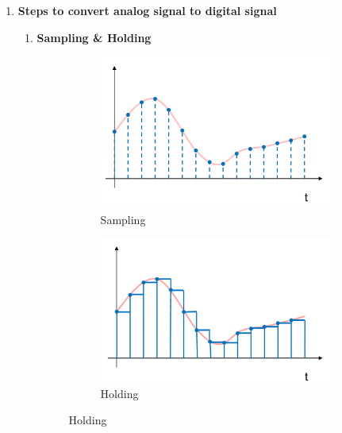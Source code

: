 \documentclass[a4paper]{article}
\begin{document}
\begin{enumerate}[label = \arabic*.]
    \item \textbf{Steps to convert analog signal to digital signal}
      \begin{enumerate}[label = \arabic*.]
        \item \textbf{Sampling \& Holding}
          \begin{figure}[H]
            \centering
            \begin{subfigure}[b]{0.45\linewidth}
              \centering
              \includegraphics[width=0.9\linewidth]{ADC_sampling.jpeg}
              \caption{Sampling}
              \label{subfig:ADC_sampling.jpeg}
            \end{subfigure}
            \begin{subfigure}[b]{0.45\linewidth}
              \centering
              \includegraphics[width=0.9\linewidth]{ADC_holding.jpeg}
              \caption{Holding}
              \label{subfig:ADC_holding.jpeg}
            \end{subfigure}
            \label{fig:sampling_and_holding}
          \end{figure}


\end{enumerate}
\end{enumerate}
\end{document}
